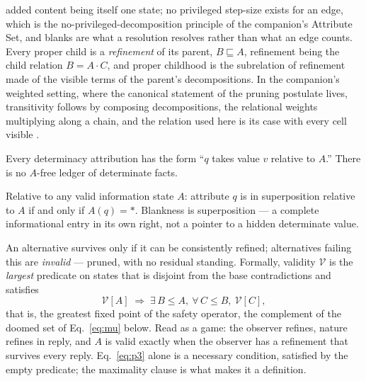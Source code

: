 added content being itself one state; no privileged step-size exists for an edge, which is the no-privileged-decomposition principle of the companion's Attribute Set, and blanks are what a resolution resolves rather than what an edge counts. Every proper child is a \emph{refinement} of its parent, $B \sqsubseteq A$, refinement being the child relation $B = A \cdot C$, and proper childhood is the subrelation of refinement made of the visible terms of the parent's decompositions. In the companion's weighted setting, where the canonical statement of the pruning postulate lives, transitivity follows by composing decompositions, the relational weights multiplying along a chain, and the relation used here is its case with every cell visible \cite{Aethus}.

\begin{postulate}[Indexing]\label{p1}
Every determinacy attribution has the form ``$q$ takes value $v$ relative to $A$.'' There is no $A$-free ledger of determinate facts.
\end{postulate}

\begin{postulate}[Blanks]\label{p2}
Relative to any valid information state $A$: attribute $q$ is in superposition relative to $A$ if and only if $A(q) = \ast$. Blankness is superposition --- a complete informational entry in its own right, not a pointer to a hidden determinate value.
\end{postulate}

\begin{postulate}[Pruning]\label{p3}
An alternative survives only if it can be consistently refined; alternatives failing this are \emph{invalid} --- pruned, with no residual standing. Formally, validity $\mathcal{V}$ is the \emph{largest} predicate on states that is disjoint from the base contradictions and satisfies
\begin{equation}\label{eq:p3}
\mathcal{V}[A] \;\Longrightarrow\; \exists\, B \le A,\ \forall\, C \le B,\ \mathcal{V}[C],
\end{equation}
that is, the greatest fixed point of the safety operator, the complement of the doomed set of Eq.~\eqref{eq:mu} below. Read as a game: the observer refines, nature refines in reply, and $A$ is valid exactly when the observer has a refinement that survives every reply. Eq.~\eqref{eq:p3} alone is a necessary condition, satisfied by the empty predicate; the maximality clause is what makes it a definition.
\end{postulate}

